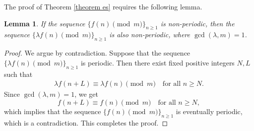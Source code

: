 \documentclass[12pt,reqno]{amsart}
\newtheorem{lemma} [theorem]{Lemma}
\begin{document}
The proof of Theorem \ref{theorem es} requires the following lemma.
\begin{lemma}\label{lemmaess}
  If the sequence $\{f(n) \pmod{m}\}_{n\geq1}$ is non-periodic, then the sequence $\{\lambda f(n) \pmod{m}\}_{n\geq1}$ is also non-periodic, where $\gcd(\lambda,m)=1$.  
\end{lemma}
\begin{proof}
We argue by contradiction. Suppose that the sequence $\{\lambda f(n) \pmod{m}\}_{n\geq 1}$ is periodic. Then there exist fixed positive integers $N,L$ such that
\begin{align}
\lambda f(n+L)\equiv \lambda f(n) \pmod{m}\quad \text{for all~}n\geq N.    
\end{align}
Since $\gcd(\lambda ,m)=1$, we get
$$f(n+L)\equiv f(n) \pmod{m}\quad \text{for all~}n\geq N,$$
which implies that the sequence $\{f(n) \pmod{m}\}_{n\geq1}$ is eventually periodic, which is a contradiction. This completes the proof.
\end{proof}
\end{document}
